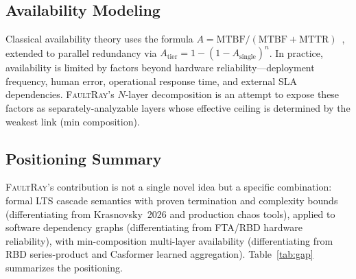 \documentclass[10pt,twocolumn]{article}
\begin{document}
\subsection{Availability Modeling}
Classical availability theory uses the formula
$A = \text{MTBF} / (\text{MTBF} + \text{MTTR})$~\cite{trivedi2001},
extended to parallel redundancy via
$A_{\text{tier}} = 1 - (1 - A_{\text{single}})^{n}$.
In practice, availability is limited by factors beyond hardware
reliability---deployment frequency, human error, operational
response time, and external SLA dependencies.
\textsc{FaultRay}'s $N$-layer decomposition is an attempt to
expose these factors as separately-analyzable layers whose
effective ceiling is determined by the weakest link (min
composition).

\subsection{Positioning Summary}
\label{sec:rw-gap}
\textsc{FaultRay}'s contribution is not a single novel idea but a
specific combination: formal LTS cascade semantics with proven
termination and complexity bounds (differentiating from
Krasnovsky~2026 and production chaos tools), applied to software
dependency graphs (differentiating from FTA/RBD hardware
reliability), with min-composition multi-layer availability
(differentiating from RBD series-product and Casformer learned
aggregation). Table~\ref{tab:gap} summarizes the positioning.
\end{document}
